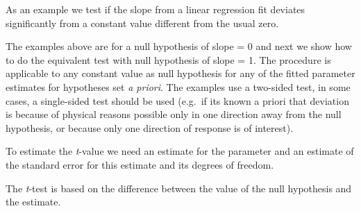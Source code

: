 \documentclass[krantz2]{krantz}\usepackage{knitr}%
\begin{document}
\begin{explainbox}
As an example we test if the slope from a linear regression fit deviates significantly from a constant value different from the usual zero.

The examples above are for a null hypothesis of slope = 0 and next we show how to do the equivalent test with null hypothesis of slope = 1. The procedure is applicable to any constant value as null hypothesis for any of the fitted parameter estimates for hypotheses set \emph{a priori}. The examples use a two-sided test, in some cases, a single-sided test should be used (e.g.\ if its known a priori that deviation is because of physical reasons possible only in one direction away from the null hypothesis, or because only one direction of response is of interest).

To estimate the \emph{t}-value we need an estimate for the parameter and an estimate of the standard error for this estimate and its degrees of freedom.

\begin{knitrout}\footnotesize
{}\color{fgcolor}\begin{kframe}
\begin{alltt}
 \hlkwb{<-} \hlopt{$}\hlstd{coef[}\hlstd{,} \hlstd{]}
 \hlkwb{<-} \hlopt{$}\hlstd{coef[}\hlstd{,} \hlstd{]}
 \hlkwb{<-} \hlopt{$}\hlstd{df[}\hlstd{]}
\end{alltt}
\end{kframe}
\end{knitrout}

The \emph{t}-test is based on the difference between the value of the null hypothesis and the estimate.

\begin{knitrout}\footnotesize
{}\color{fgcolor}\begin{kframe}
\begin{alltt}
 \hlkwb{<-} 
 \hlkwb{<-}  \hlopt{-}  \hlopt{/} 
 \hlkwb{<-}   
\end{alltt}
\end{kframe}
\end{knitrout}
\end{explainbox}
\end{document}
